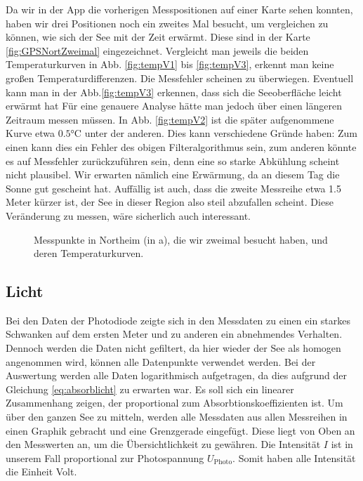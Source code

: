 \documentclass[12pt,a4paper,titlepage,headinclude,bibtotoc]{scrartcl}
\numberwithin{equation}{subsection}
\begin{document}
Da wir in der App die vorherigen Messpositionen auf einer Karte sehen konnten, haben wir drei Positionen noch ein zweites Mal besucht, um vergleichen zu können, wie sich der See mit der Zeit erwärmt.
Diese sind in der Karte \ref{fig:GPSNortZweimal} eingezeichnet.
Vergleicht man jeweils die beiden Temperaturkurven in Abb. \ref{fig:tempV1} bis \ref{fig:tempV3}, erkennt man keine großen Temperaturdifferenzen.
Die Messfehler scheinen zu überwiegen.
Eventuell kann man in der Abb.\ref{fig:tempV3} erkennen, dass sich die Seeoberfläche leicht erwärmt hat
Für eine genauere Analyse hätte man jedoch über einen längeren Zeitraum messen müssen.
In Abb. \ref{fig:tempV2} ist die später aufgenommene Kurve etwa $0.5\si\celsius$ unter der anderen.
Dies kann verschiedene Gründe haben: Zum einen kann dies ein Fehler des obigen Filteralgorithmus sein, zum anderen könnte es auf Messfehler zurückzuführen sein, denn eine so starke Abkühlung scheint nicht plausibel.
Wir erwarten nämlich eine Erwärmung, da an diesem Tag die Sonne gut gescheint hat.
Auffällig ist auch, dass die zweite Messreihe etwa 1.5 Meter kürzer ist, der See in dieser Region also steil abzufallen scheint.
Diese Veränderung zu messen, wäre sicherlich auch interessant.

\begin{figure}[!htb]
	\centering
   \hfill
   \hfill
   \hfill
	\caption{Messpunkte in Northeim (in a), die wir zweimal besucht haben, und deren Temperaturkurven.}
	\label{fig:tempNort2}
\end{figure}


\subsection{Licht}

Bei den Daten der Photodiode zeigte sich in den Messdaten zu einen ein starkes Schwanken auf dem ersten Meter und zu anderen ein abnehmendes Verhalten.
Dennoch werden die Daten nicht gefiltert, da hier wieder der See als homogen angenommen wird, können alle Datenpunkte verwendet werden.
Bei der Auswertung werden alle Daten logarithmisch aufgetragen, da dies aufgrund der Gleichung \ref{eq:absorblicht} zu erwarten war. 
Es soll sich ein linearer Zusammenhang zeigen, der proportional zum Absorbtionskoeffizienten ist.
Um über den ganzen See zu mitteln, werden alle Messdaten aus allen Messreihen in einen Graphik gebracht und eine Grenzgerade eingefügt.
Diese liegt von Oben an den Messwerten an, um die Übersichtlichkeit zu gewähren.
Die Intensität $I$ ist in unserem Fall proportional zur Photospannung $U_\text{Photo}$.
Somit haben alle Intensität die Einheit Volt.
\end{document}
